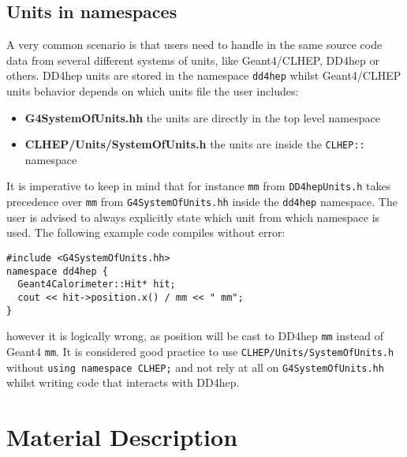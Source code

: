 \subsection{Units in namespaces}
A very common scenario is that users need to handle in the same source code data from several different systems of units, like Geant4/CLHEP, DD4hep or others. DD4hep units are stored in the namespace \texttt{dd4hep} whilst Geant4/CLHEP units behavior depends on which units file the user includes:
\begin{itemize}
\item \textbf{G4SystemOfUnits.hh} the units are directly in the top level namespace
\item \textbf{CLHEP/Units/SystemOfUnits.h} the units are inside the \texttt{CLHEP::} namespace
\end{itemize}
It is imperative to keep in mind that for instance \texttt{mm} from \texttt{DD4hepUnits.h} takes precedence over \texttt{mm} from \texttt{G4SystemOfUnits.hh} inside the \texttt{dd4hep} namespace. The user is advised to always explicitly state which unit from which namespace is used. The following example code compiles without error:
\begin{verbatim}
#include <G4SystemOfUnits.hh>
namespace dd4hep {
  Geant4Calorimeter::Hit* hit;
  cout << hit->position.x() / mm << " mm";
}
\end{verbatim}
however it is logically wrong, as position will be cast to DD4hep \texttt{mm} instead of Geant4 \texttt{mm}. It is considered good practice to use \texttt{CLHEP/Units/SystemOfUnits.h} without \texttt{using namespace CLHEP;} and not rely at all on \texttt{G4SystemOfUnits.hh} whilst writing code that interacts with DD4hep.


\section{Material Description}
\label{sec:compact-material-description}

